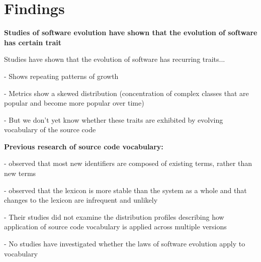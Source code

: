 \chapter{Findings} %
\label{cha:findings}

\excrumbs
{
	\textbf{Studies of software evolution have shown that the evolution of software has certain trait}
	
	Studies have shown that the evolution of software has recurring traits...
	
	- Shows repeating patterns of growth
	
	- Metrics show a skewed distribution (concentration of complex classes that are popular and become more popular over time)
	
	- But we don't yet know whether these traits are exhibited by evolving vocabulary of the source code
}

\excrumbs
{
	\textbf{Previous research of source code vocabulary:}
	
	- \cite{Abebe09a} observed that most new identifiers are composed of existing terms, rather than new terms
	
	- \cite{Antoniol07a} observed that the lexicon is more stable than the system as a whole and that changes to the lexicon are infrequent and unlikely
	
	- Their studies did not examine the distribution profiles describing how application of source code vocabulary is applied across multiple versions
	
	- No studies have investigated whether the laws of software evolution apply to vocabulary
}

